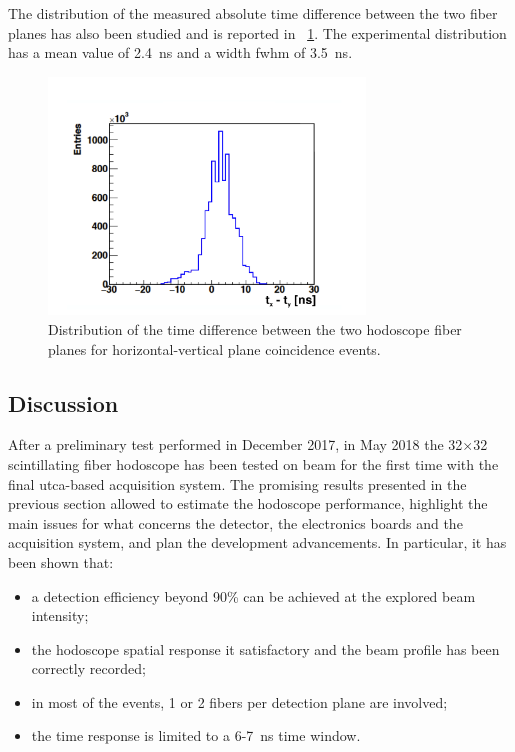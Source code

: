 The distribution of the measured absolute time difference between the two fiber planes has also been studied and is reported in \figurename~\ref{chap6::fig::May_HodoDeltaTFibers}. The experimental distribution has a mean value of 2.4~ns and a width \gls{fwhm} of 3.5~ns.

\begin{figure}[!htbp]
\centering
\includegraphics[width=0.75\textwidth]{03_GraphicFiles/chapter6_BeamTests/Nice_May2018/TX-TY.png}
\caption{Distribution of the time difference between the two hodoscope fiber planes for horizontal-vertical plane coincidence events.}
\label{chap6::fig::May_HodoDeltaTFibers}
\end{figure}

\subsection{Discussion}\label{chap6::subsec::mayDiscussion} 

After a preliminary test performed in December 2017, in May 2018 the 32$\times$32 scintillating fiber hodoscope has been tested on beam for the first time with the final \gls{utca}-based acquisition system. The promising results presented in the previous section allowed to estimate the hodoscope performance, highlight the main issues for what concerns the detector, the electronics boards and the acquisition system, and plan the development advancements.
In particular, it has been shown that:
\begin{itemize}
\item a detection efficiency beyond 90\% can be achieved at the explored beam intensity;
\item the hodoscope spatial response it satisfactory and the beam profile has been correctly recorded;
\item in most of the events, 1 or 2 fibers per detection plane are involved;
\item the time response is limited to a 6-7~ns time window.
\end{itemize}

